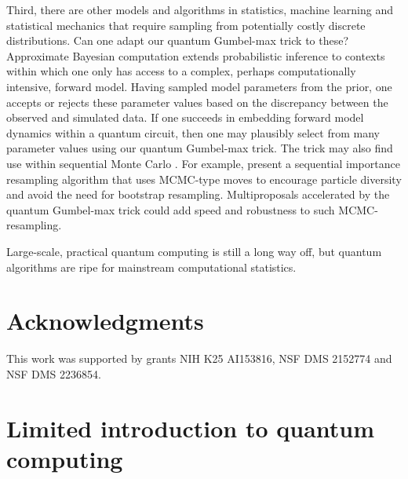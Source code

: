 \documentclass[12pt]{article} %
\begin{document}
Third, there are other models and algorithms in statistics, machine learning and statistical mechanics that require sampling from potentially costly discrete distributions.   Can one adapt  our quantum Gumbel-max trick to these?  Approximate Bayesian computation \citep{csillery2010approximate} extends probabilistic inference to contexts within which one only has access to a complex, perhaps computationally intensive, forward model.  Having sampled model parameters from the prior, one accepts or rejects these parameter values based on the discrepancy between the observed and simulated data.  If one succeeds in embedding forward model dynamics within a quantum circuit, then one may plausibly select from many parameter values using our quantum Gumbel-max trick.  The trick may also find use within sequential Monte Carlo \citep{doucet2001sequential}.  For example, \citet{berzuini2001resample} present a sequential importance resampling algorithm that uses MCMC-type moves to encourage particle diversity and avoid the need for bootstrap resampling.  Multiproposals accelerated by the quantum Gumbel-max trick could add speed and robustness to such MCMC-resampling.

Large-scale, practical quantum computing is still a long way off, but quantum algorithms are ripe for mainstream computational statistics.





\section*{Acknowledgments}

This work was supported by grants NIH K25 AI153816, NSF DMS 2152774 and NSF DMS 2236854.

\appendix

\section{Limited introduction to quantum computing}\label{sec:shortIntro}
\end{document}
